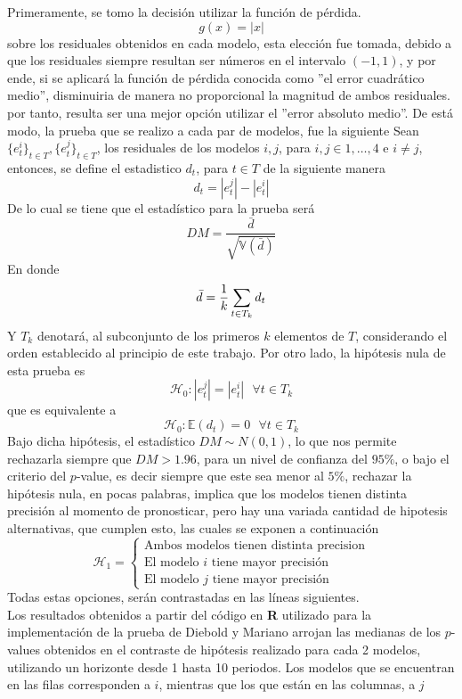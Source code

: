 \documentclass{article}
\theoremstyle{remark}
\begin{document}
Primeramente, se tomo la decisión utilizar la función de pérdida.
\[g(x) = \left |x\right | \]
sobre los residuales obtenidos en cada modelo, esta elección fue tomada, debido a que los residuales siempre resultan ser números en el intervalo \((-1,1)\), y por ende, si se aplicará la función de pérdida conocida como ''el error cuadrático medio'', disminuiria de manera no proporcional  la magnitud de ambos residuales. por tanto, resulta ser una mejor opción utilizar el ''error absoluto medio''. De está modo, la prueba que se realizo a cada par de modelos, fue la siguiente
Sean \(\{e_{t}^{i}\}_{t \in T},\{e_{t}^{j}\}_{t \in T}\), los residuales de los modelos \(i,j\), para \(i,j \in {1,\hdots, 4}\) e \(i \neq j\), entonces, se define el estadistico 
\(d_t\), para \(t \in T\) de la siguiente manera
\[d_t = \left|e_{t}^{j}\right| -  \left|e_{t}^{i}\right|\] 
De lo cual se tiene que el estadístico para la prueba será 
\[DM = \frac{\bar{d}}{\sqrt{\mathbb{V}(\bar{d})}}\]
En donde
\[
\bar{d} = \frac{1}{k}\sum_{t \in T_{k}}d_t \\
\]
Y \(T_k\) denotará, al subconjunto de los primeros \(k\) elementos de \(T\), considerando el orden establecido al principio de este trabajo. Por otro lado, la hipótesis nula de esta prueba es
\[\mathscr{H}_0: \left|e_{t}^{j}\right| = \left|e_{t}^{i}\right| \ \ \ \forall t \in T_k\]
que es equivalente a 
\[\mathscr{H}_0: \mathbb{E}(d_t) = 0 \ \ \ \forall t \in T_k\]
Bajo dicha hipótesis, el estadístico \(DM \sim N(0,1)\), lo que nos permite rechazarla siempre que \(DM > 1.96\), para un nivel 
de confianza del \(95\%\), o bajo el criterio del \(p\)-value, es decir siempre que este sea menor al \(5\%\), rechazar la hipótesis 
nula, en pocas palabras, implica que los modelos tienen distinta precisión al momento de pronosticar, pero hay una variada cantidad de hipotesis
alternativas, que cumplen esto, las cuales se exponen a continuación  
\[
\mathscr{H}_1 = \left\{\begin{matrix}
\text{Ambos modelos tienen distinta precision} \\
\text{El modelo \(i\) tiene mayor precisión}\\ 
\text{El modelo \(j\) tiene mayor precisión}
\end{matrix}\right.
\]
Todas estas opciones, serán contrastadas en las líneas siguientes.\\

Los resultados obtenidos a partir del código en \textbf{R} utilizado para la implementación de la prueba de Diebold y Mariano arrojan las medianas de los \(p\)-values obtenidos en el contraste de  hipótesis realizado para cada 2 modelos, utilizando un horizonte desde 1 hasta 10 periodos. Los modelos que se encuentran en las filas corresponden a \(i\), mientras que los que están en las columnas, a \(j\)
\end{document}
